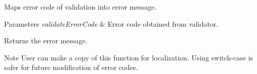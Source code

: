 Maps error code of validation into error message. 


\begin{DoxyParams}{Parameters}
{\em validate\+Error\+Code} & Error code obtained from validator. \\
\hline
\end{DoxyParams}
\begin{DoxyReturn}{Returns}
the error message. 
\end{DoxyReturn}
\begin{DoxyNote}{Note}
User can make a copy of this function for localization. Using switch-\/case is safer for future modification of error codes. 
\end{DoxyNote}
